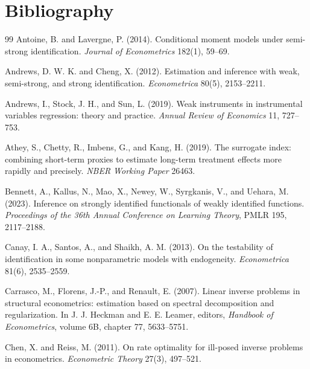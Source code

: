 \documentclass[11pt]{article}
\theoremstyle{definition}
\theoremstyle{plain}
\theoremstyle{remark}
\begin{document}
\section*{Bibliography}
\begin{thebibliography}{99}
Antoine, B. and Lavergne, P. (2014).
Conditional moment models under semi-strong identification.
\textit{Journal of Econometrics} 182(1), 59--69.

Andrews, D. W. K. and Cheng, X. (2012).
Estimation and inference with weak, semi-strong, and strong identification.
\textit{Econometrica} 80(5), 2153--2211.

Andrews, I., Stock, J. H., and Sun, L. (2019).
Weak instruments in instrumental variables regression: theory and practice.
\textit{Annual Review of Economics} 11, 727--753.

Athey, S., Chetty, R., Imbens, G., and Kang, H. (2019).
The surrogate index: combining short-term proxies to estimate long-term
treatment effects more rapidly and precisely.
\textit{NBER Working Paper} 26463.

Bennett, A., Kallus, N., Mao, X., Newey, W., Syrgkanis, V., and Uehara, M.
(2023).
Inference on strongly identified functionals of weakly identified functions.
\textit{Proceedings of the 36th Annual Conference on Learning Theory},
PMLR 195, 2117--2188.

Canay, I. A., Santos, A., and Shaikh, A. M. (2013).
On the testability of identification in some nonparametric models with
endogeneity.
\textit{Econometrica} 81(6), 2535--2559.

Carrasco, M., Florens, J.-P., and Renault, E. (2007).
Linear inverse problems in structural econometrics: estimation based on
spectral decomposition and regularization.
In J. J. Heckman and E. E. Leamer, editors,
\textit{Handbook of Econometrics}, volume 6B, chapter 77, 5633--5751.

Chen, X. and Reiss, M. (2011).
On rate optimality for ill-posed inverse problems in econometrics.
\textit{Econometric Theory} 27(3), 497--521.


\end{thebibliography}
\end{document}

